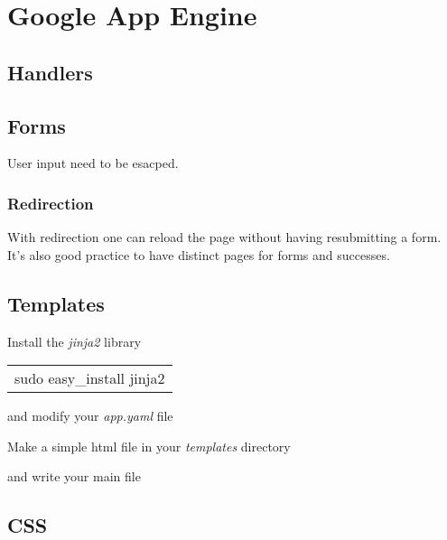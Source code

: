 \documentclass[12pt]{article}
\begin{document}
\section{Google App Engine}

\subsection{Handlers}



\subsection{Forms}



User input need to be esacped.



\subsubsection{Redirection}

With redirection one can reload the page without having resubmitting a form. It's also good practice to have distinct pages for forms and successes.



\subsection{Templates}

Install the \emph{jinja2} library

\begin{tabular}{l}
sudo easy\_install jinja2
\end{tabular}

and modify your \emph{app.yaml} file



Make a simple html file in your \emph{templates} directory



and write your main file



\subsection{CSS}
\end{document}
